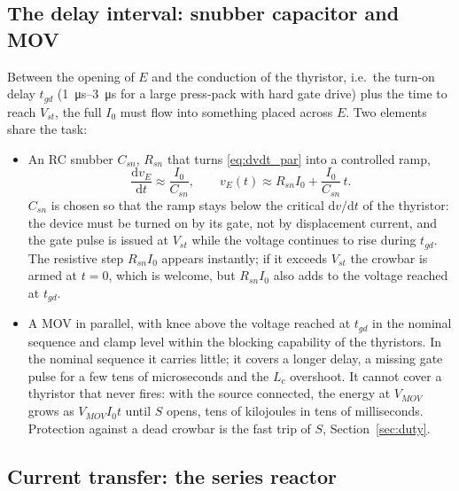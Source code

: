 \documentclass[11pt,a4paper]{article}
\begin{document}
\subsection{The delay interval: snubber capacitor and MOV}

Between the opening of $E$ and the conduction of the thyristor, i.e.\ the turn-on delay
$t_{gd}$ (\SIrange{1}{3}{\micro s} for a large press-pack with hard gate drive) plus the time to
reach $V_{st}$, the full $I_0$ must flow into something placed across $E$. Two elements share
the task:

\begin{itemize}
\item An RC snubber $C_{sn}$, $R_{sn}$ that turns \eqref{eq:dvdt_par} into a controlled ramp,
      \begin{equation}
        \frac{\mathrm{d}v_E}{\mathrm{d}t} \approx \frac{I_0}{C_{sn}},
        \qquad v_E(t) \approx R_{sn} I_0 + \frac{I_0}{C_{sn}}\,t .
        \label{eq:ramp}
      \end{equation}
      $C_{sn}$ is chosen so that the ramp stays below the critical $\mathrm{d}v/\mathrm{d}t$ of
      the thyristor: the device must be turned on by its gate, not by displacement current, and
      the gate pulse is issued at $V_{st}$ while the voltage continues to rise during $t_{gd}$.
      The resistive step $R_{sn} I_0$ appears instantly; if it exceeds $V_{st}$ the crowbar is
      armed at $t = 0$, which is welcome, but $R_{sn} I_0$ also adds to the voltage reached at
      $t_{gd}$.
\item A MOV in parallel, with knee above the voltage reached at $t_{gd}$ in the nominal
      sequence and clamp level within the blocking capability of the thyristors. In the
      nominal sequence it carries little; it covers a longer delay, a missing gate pulse for a
      few tens of microseconds and the $L_c$ overshoot. It cannot cover a thyristor that never
      fires: with the source connected, the energy at $V_{MOV}$ grows as $V_{MOV} I_0 t$ until
      $S$ opens, tens of kilojoules in tens of milliseconds. Protection against a dead crowbar
      is the fast trip of $S$, Section~\ref{sec:duty}.
\end{itemize}

\subsection{Current transfer: the series reactor}
\end{document}
